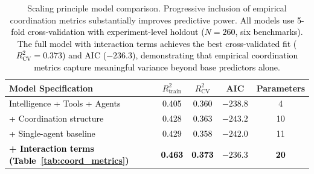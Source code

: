 \begin{table}[t!]
  \centering
  \caption{Scaling principle model comparison. Progressive inclusion of empirical coordination metrics substantially improves predictive power. \textcolor{black}{All models use 5-fold cross-validation with experiment-level holdout ($N=260$, six benchmarks). The full model with interaction terms achieves the best cross-validated fit ($R^2_{\text{CV}}=0.373$) and AIC ($-236.3$), demonstrating that empirical coordination metrics capture meaningful variance beyond base predictors alone.}}
  \label{tab:model_comparison}
  {\small
  \begin{tabular}{lcccc}
  \toprule
  \textbf{Model Specification} & \textbf{$R^2_{\text{train}}$} & \textbf{$R^2_{\text{CV}}$} & \textbf{AIC} & \textbf{Parameters} \\
  \midrule
  \textcolor{black}{Intelligence + Tools + Agents} & \textcolor{black}{0.405} & \textcolor{black}{0.360} & \textcolor{black}{$-238.8$} & \textcolor{black}{4} \\
  \textcolor{black}{+ Coordination structure} & \textcolor{black}{0.428} & \textcolor{black}{0.363} & \textcolor{black}{$-243.2$} & \textcolor{black}{10} \\
  \textcolor{black}{+ Single-agent baseline} & \textcolor{black}{0.429} & \textcolor{black}{0.358} & \textcolor{black}{$-242.0$} & \textcolor{black}{11} \\
  \textcolor{black}{\textbf{+ Interaction terms (Table~\ref{tab:coord_metrics})}} & \textcolor{black}{\textbf{0.463}} & \textcolor{black}{\textbf{0.373}} & \textcolor{black}{\textbf{$-236.3$}} & \textcolor{black}{\textbf{20}} \\
  \bottomrule
  \end{tabular}
  }
  \vspace{3pt}
  \parbox{\linewidth}{\footnotesize
  \vspace{4pt}
  
  }
\end{table}
  
  
  

